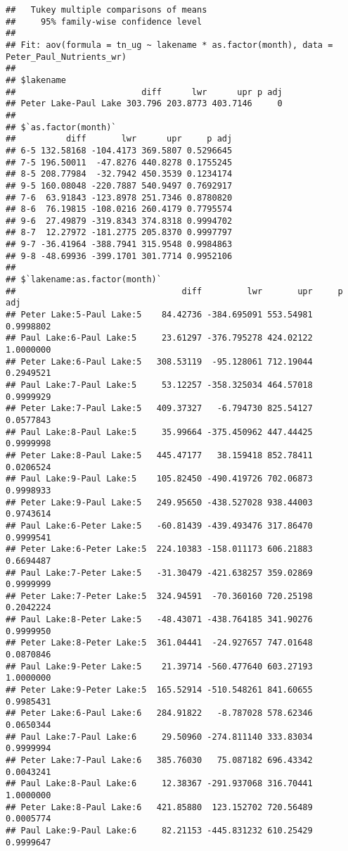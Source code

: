 \documentclass[]{article}
\begin{document}
\begin{verbatim}
##   Tukey multiple comparisons of means
##     95% family-wise confidence level
## 
## Fit: aov(formula = tn_ug ~ lakename * as.factor(month), data = Peter_Paul_Nutrients_wr)
## 
## $lakename
##                         diff      lwr      upr p adj
## Peter Lake-Paul Lake 303.796 203.8773 403.7146     0
## 
## $`as.factor(month)`
##          diff       lwr      upr     p adj
## 6-5 132.58168 -104.4173 369.5807 0.5296645
## 7-5 196.50011  -47.8276 440.8278 0.1755245
## 8-5 208.77984  -32.7942 450.3539 0.1234174
## 9-5 160.08048 -220.7887 540.9497 0.7692917
## 7-6  63.91843 -123.8978 251.7346 0.8780820
## 8-6  76.19815 -108.0216 260.4179 0.7795574
## 9-6  27.49879 -319.8343 374.8318 0.9994702
## 8-7  12.27972 -181.2775 205.8370 0.9997797
## 9-7 -36.41964 -388.7941 315.9548 0.9984863
## 9-8 -48.69936 -399.1701 301.7714 0.9952106
## 
## $`lakename:as.factor(month)`
##                                 diff         lwr       upr     p adj
## Peter Lake:5-Paul Lake:5    84.42736 -384.695091 553.54981 0.9998802
## Paul Lake:6-Paul Lake:5     23.61297 -376.795278 424.02122 1.0000000
## Peter Lake:6-Paul Lake:5   308.53119  -95.128061 712.19044 0.2949521
## Paul Lake:7-Paul Lake:5     53.12257 -358.325034 464.57018 0.9999929
## Peter Lake:7-Paul Lake:5   409.37327   -6.794730 825.54127 0.0577843
## Paul Lake:8-Paul Lake:5     35.99664 -375.450962 447.44425 0.9999998
## Peter Lake:8-Paul Lake:5   445.47177   38.159418 852.78411 0.0206524
## Paul Lake:9-Paul Lake:5    105.82450 -490.419726 702.06873 0.9998933
## Peter Lake:9-Paul Lake:5   249.95650 -438.527028 938.44003 0.9743614
## Paul Lake:6-Peter Lake:5   -60.81439 -439.493476 317.86470 0.9999541
## Peter Lake:6-Peter Lake:5  224.10383 -158.011173 606.21883 0.6694487
## Paul Lake:7-Peter Lake:5   -31.30479 -421.638257 359.02869 0.9999999
## Peter Lake:7-Peter Lake:5  324.94591  -70.360160 720.25198 0.2042224
## Paul Lake:8-Peter Lake:5   -48.43071 -438.764185 341.90276 0.9999950
## Peter Lake:8-Peter Lake:5  361.04441  -24.927657 747.01648 0.0870846
## Paul Lake:9-Peter Lake:5    21.39714 -560.477640 603.27193 1.0000000
## Peter Lake:9-Peter Lake:5  165.52914 -510.548261 841.60655 0.9985431
## Peter Lake:6-Paul Lake:6   284.91822   -8.787028 578.62346 0.0650344
## Paul Lake:7-Paul Lake:6     29.50960 -274.811140 333.83034 0.9999994
## Peter Lake:7-Paul Lake:6   385.76030   75.087182 696.43342 0.0043241
## Paul Lake:8-Paul Lake:6     12.38367 -291.937068 316.70441 1.0000000
## Peter Lake:8-Paul Lake:6   421.85880  123.152702 720.56489 0.0005774
## Paul Lake:9-Paul Lake:6     82.21153 -445.831232 610.25429 0.9999647

\end{verbatim}
\end{document}

